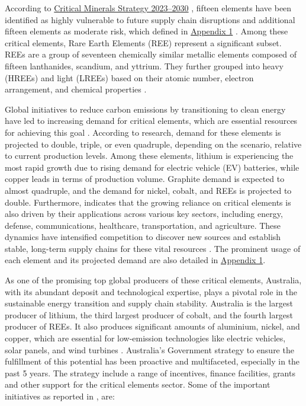 \documentclass[11pt,a4paper,]{article}
\begin{document}
According to \href{https://www.industry.gov.au/publications/critical-minerals-strategy-2023-2030}{Critical Minerals Strategy 2023--2030} \autocite{geoscience2023}, fifteen elements have been identified as highly vulnerable to future supply chain disruptions and additional fifteen elements as moderate risk, which defined in \hyperref[sec-appendixone]{Appendix 1} \autocite{Coyne2023,Skirrow2013,IEA2024b,Fortier2018,Austrade2024}. Among these critical elements, Rare Earth Elements (REE) represent a significant subset. REEs are a group of seventeen chemically similar metallic elements composed of fifteen lanthanides, scandium, and yttrium. They further grouped into heavy (HREEs) and light (LREEs) based on their atomic number, electron arrangement, and chemical properties \autocite{Reid2018}.

Global initiatives to reduce carbon emissions by transitioning to clean energy have led to increasing demand for critical elements, which are essential resources for achieving this goal \autocite{IEA2021,Wang2022}. According to \textcite{IEA2024} research, demand for these elements is projected to double, triple, or even quadruple, depending on the scenario, relative to current production levels. Among these elements, lithium is experiencing the most rapid growth due to rising demand for electric vehicle (EV) batteries, while copper leads in terms of production volume. Graphite demand is expected to almost quadruple, and the demand for nickel, cobalt, and REEs is projected to double. Furthermore, \textcite{Fortier2018} indicates that the growing reliance on critical elements is also driven by their applications across various key sectors, including energy, defense, communications, healthcare, transportation, and agriculture. These dynamics have intensified competition to discover new sources and establish stable, long-term supply chains for these vital resources \autocite{Emsbo2021}. The prominent usage of each element and its projected demand are also detailed in \hyperref[sec-appendixone]{Appendix 1}.

As one of the promising top global producers of these critical elements, Australia, with its abundant deposit and technological expertise, plays a pivotal role in the sustainable energy transition and supply chain stability. Australia is the largest producer of lithium, the third largest producer of cobalt, and the fourth largest producer of REEs. It also produces significant amounts of aluminium, nickel, and copper, which are essential for low-emission technologies like electric vehicles, solar panels, and wind turbines \autocite{DISR2023}. Australia's Government strategy to ensure the fulfillment of this potential has been proactive and multifaceted, especially in the past 5 years. The strategy include a range of incentives, finance facilities, grants and other support for the critical elements sector. Some of the important initiatives as reported in \textcite{DISR2023}, are:
\end{document}
